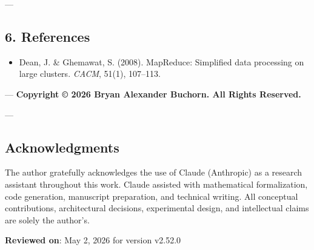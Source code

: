 ---

\subsection{6. References}

\begin{itemize}
\item [dean\-2008\-mapreduce] Dean, J. \& Ghemawat, S. (2008). MapReduce: Simplified data processing on large clusters. \textit{CACM}, 51(1), 107–113.

\end{itemize}
---
\textbf{Copyright © 2026 Bryan Alexander Buchorn. All Rights Reserved.}

---
\subsection{Acknow\-ledgments}

The author gratefully ackno\-wledges the use of Claude (Anthropic) as a research assistant throughout this work. Claude assisted with mathe\-matical forma\-lization, code generation, manuscript preparation, and technical writing. All conceptual contr\-ibutions, archi\-tectural decisions, exper\-imental design, and intel\-lectual claims are solely the author's.

\textbf{Reviewed on}: May 2, 2026 for version v2.52.0
